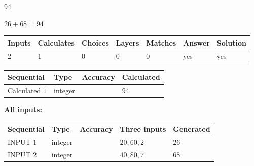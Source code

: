 \documentclass{ctexart}
\begin{document}
 
 
\noindent{}
 
 

94
 
 
\noindent{}
 
 

 
 
 
\noindent{}
 
 

$ %
26 +  %
68=   %
94$
 
 
\noindent{}
 
 

 
   
   
   
   
\noindent\begin{tabular}{|l|l|l|l|l|l|l|}
 \hline
Inputs & Calculates & Choices & Layers & Matches & Answer & Solution \\ \hline
 2  & 
 1  & 
 0
  & 
 0  & 
 0  & 
  yes & 
  yes 
  \\ \hline
 \end{tabular}
   
   
   
   
\noindent{}
   
   
  
  
\noindent\begin{tabular}{|l|l|l|l|}
\hline
 Sequential & Type & Accuracy & Calculated \\ 
\hline
 
 
  Calculated $  1 $ & integer &  & 
  $ 94 $ 
 \\  \hline  
 \end{tabular}
   
   
   
   
\noindent\vspace{0.1in}\hspace{-0.08in} {\textbf{\Large{All inputs: }}}
   
   
  
  
\noindent\begin{tabular}{|l|l|l|l|l|}
\hline
 Sequential & Type & Accuracy & Three inputs & Generated \\ 
\hline
 
 
  INPUT $  1 $ & integer &  & $
 20
 , 
 60
 , 
 2
 $ & $ 26 $ 
 \\  \hline  
 
 
  INPUT $  2 $ & integer &  & $
 40
 , 
 80
 , 
 7
 $ & $ 68 $ 
 \\  \hline  
 \end{tabular}
   
\end{document}
